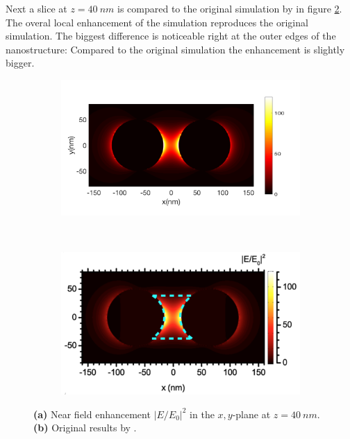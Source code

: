 Next a slice at $z=\SI{40}{nm}$ is compared to the original simulation by \cite{heeg} in figure \ref{slice-comparision}. The overal local enhancement of the simulation reproduces the original simulation. The biggest difference is noticeable right at the outer edges of the nanostructure: Compared to the original simulation the enhancement is slightly bigger.

\begin{figure}[!h]
  \centering
  \begin{subfigure}{0.50\textwidth}
    \includegraphics[width=\textwidth]{./images/40nm.png}
  \end{subfigure}
  ~
  \begin{subfigure}{0.40\textwidth}
    \includegraphics[width=\textwidth]{./images/local-enhancement-heeg.png}
    \label{heeg-result}
  \end{subfigure}
  \label{slice-comparision}
  \caption{\textbf{(a)} Near field enhancement $|E/E_0|^2$ in the $x,y$-plane at $z=\SI{40}{nm}$. \textbf{(b)} Original results by \cite{heeg}.}
\end{figure}

